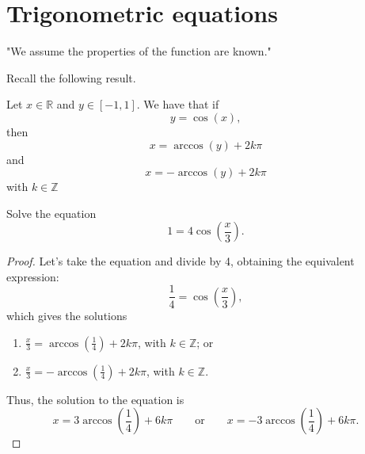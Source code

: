 \documentclass[letterpaper,11pt]{watml-notes}
\author{Author Name}
\date{\today}
\begin{document}
\generateHeader

\vspace*{-8mm}
\section{Trigonometric equations}

\begin{warning}
    "We assume the properties of the function are known."

\end{warning}

Recall the following result.
\begin{theorem}
    Let \( x \in \mathbb{R} \) and \( y \in [-1, 1] \). We have that if
\[
    y = \cos(x),
\]
then
\[
    x = \arccos(y) + 2k\pi
\]
and
\[
    x = -\arccos(y) + 2k\pi
\]
with \( k \in \mathbb{Z} \)
\end{theorem}

\begin{ex}
    Solve the equation
\[
    1 = 4\cos\left(\frac{x}{3}\right).
\]
\end{ex}

\begin{proof}
   Let's take the equation and divide by 4, obtaining the equivalent expression:
\[
\frac{1}{4} = \cos\left(\frac{x}{3}\right),
\]
which gives the solutions
\begin{enumerate}[label=\textit{\alph*)}]
    \item\label{ej01:c01} \(\displaystyle \frac{x}{3} = \arccos\left(\frac{1}{4}\right) + 2k\pi\), with \(k \in \mathbb{Z}\); or
    \item\label{ej01:c02} \(\displaystyle \frac{x}{3} = -\arccos\left(\frac{1}{4}\right) + 2k\pi\), with \(k \in \mathbb{Z}\).
\end{enumerate}
Thus, the solution to the equation is
\[
x = 3\arccos\left(\frac{1}{4}\right) + 6k\pi
\qquad\text{or}\qquad
x = -3\arccos\left(\frac{1}{4}\right) + 6k\pi.
\]
\end{proof}
\end{document}
